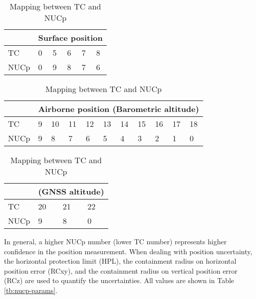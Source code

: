 \begin{table}[ht]
\caption{Mapping between TC and NUCp}
\label{tb:tc-nucp-mapping}

\begin{subtable}[t]{0.7\linewidth}
\begin{tabular}{|l||l|l|l|l|l|}
\hline
 & \multicolumn{5}{l|}{Surface position}  \\ \hline
TC & 0 & 5 & 6 & 7 & 8 \\ \hline
NUCp & 0 & 9 & 8 & 7 & 6 \\ \hline
\end{tabular}
\end{subtable}

\vspace{0.2cm}

\begin{subtable}[t]{0.7\linewidth}
\begin{tabular}{|l||l|l|l|l|l|l|l|l|l|l|}
\hline
  & \multicolumn{10}{l|}{Airborne position (Barometric altitude)} \\ \hline
TC & 9 & 10 & 11 & 12 & 13 & 14 & 15 & 16 & 17 & 18 \\ \hline
NUCp & 9 & 8 & 7 & 6 & 5 & 4 & 3 & 2 & 1 & 0 \\ \hline
\end{tabular}
\end{subtable}

\vspace{0.2cm}

\begin{subtable}[t]{0.7\linewidth}
\begin{tabular}{|l||l|l|l|}
\hline
  & \multicolumn{3}{l|}{(GNSS altitude)} \\ \hline
TC & 20 & 21 & 22 \\ \hline
NUCp & 9 & 8 & 0 \\ \hline
\end{tabular}
\end{subtable}

\end{table}

In general, a higher NUCp number (lower TC number) represents higher confidence in the position measurement. When dealing with position uncertainty, the horizontal protection limit (HPL), the containment radius on horizontal position error (RCxy), and the containment radius on vertical position error (RCz) are used to quantify the uncertainties. All values are shown in Table \ref{tb:nucp-params}.

